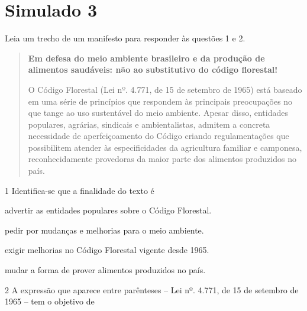 \chapter{Simulado 3}

Leia um trecho de um manifesto para responder às questões 1 e 2.

\begin{quote}
\textbf{Em defesa do meio ambiente brasileiro e da produção de alimentos
saudáveis: não ao substitutivo do código florestal!}


O Código Florestal (Lei nº. 4.771, de 15 de setembro de 1965) está
baseado em uma série de princípios que respondem às principais
preocupações no que tange ao uso sustentável do meio ambiente. Apesar
disso, entidades populares, agrárias, sindicais e ambientalistas,
admitem a concreta necessidade de aperfeiçoamento do Código criando
regulamentações que possibilitem atender às especificidades da
agricultura familiar e camponesa, reconhecidamente provedoras da maior
parte dos alimentos produzidos no país.

\end{quote}

\num{1} Identifica-se que a finalidade do texto é

\begin{escolha}
\item advertir as entidades populares sobre o Código Florestal.

\item pedir por mudanças e melhorias para o meio ambiente.

\item exigir melhorias no Código Florestal vigente desde 1965.

\item mudar a forma de prover alimentos produzidos no país.
\end{escolha}

\num{2} A expressão que aparece entre parênteses -- Lei nº. 4.771, de 15
de setembro de 1965 -- tem o objetivo de

